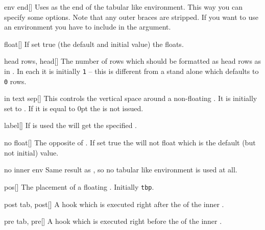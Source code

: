 \begin{describeopt}{env end}[]%
  Uses  as the end of the tabular like environment. This way you can
  specify some options. Note that any outer braces are stripped. If you want to
  use an environment you have to include  in the argument.
\end{describeopt}%
\begin{describeopt}{float}[]%
  If set true (the default and initial value) the  floats.
\end{describeopt}%
\begin{describeopt}{head rows, head}[]%
  The number of rows which should be formatted as head rows as in
  . In each  it is initially \texttt{1} -- this is
  different from a stand alone  which defaults to \texttt{0}
  rows.
\end{describeopt}%
\begin{describeopt}{in text sep}[]
  This controls the vertical space around a non-floating . It is
  initially set to . If it is equal to 0pt the  is not
  issued.
\end{describeopt}
\begin{describeopt}{label}[]%
  If  is used the  will get the specified
  .
\end{describeopt}%
\begin{describeopt}{no float}[]%
  The opposite of . If set true the  will not float
  which is the default (but not initial) value.
\end{describeopt}%
\begin{describeopt}{no inner env}%
  Same result as , so no tabular like
  environment is used at all.
\end{describeopt}%
\begin{describeopt}{pos}[]%
  The placement of a floating . Initially \texttt{tbp}.
\end{describeopt}%
\begin{describeopt}{post tab, post}[]%
  A hook which is executed right after the  of the inner
  .
\end{describeopt}%
\begin{describeopt}{pre tab, pre}[]%
  A hook which is executed right before the  of the inner
  .
\end{describeopt}%
